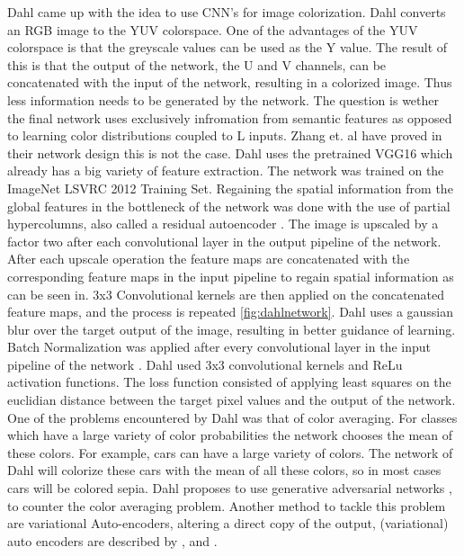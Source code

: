 Dahl \cite{Dahl} came up with the idea to use CNN's for image colorization. Dahl converts an RGB image to the YUV colorspace. One of the advantages of the YUV colorspace is that the greyscale values can be used as the Y value.
The result of this is that the output of the network, the U and V channels, can be concatenated with the input of the network, resulting in a colorized image. Thus less information needs to be generated by the network. 
The question is wether the final network uses exclusively infromation from semantic features as opposed to learning color distributions coupled to L inputs. 
Zhang et. al \cite{Zhang} have proved in their network design this is not the case. Dahl uses the pretrained VGG16 which already has a big variety of feature extraction. The network was trained on the ImageNet LSVRC 2012 Training Set. Regaining the spatial information from the global features in the bottleneck of the network was done with the use of partial hypercolumns, also called a residual autoencoder \cite{hariharan2015hypercolumns}. The image is upscaled by a factor two after each convolutional layer in the output pipeline of the network. After each upscale operation the feature maps are concatenated with the corresponding feature maps in the input pipeline to regain spatial information as can be seen in. 3x3 Convolutional kernels are then applied on the concatenated feature maps, and the process is repeated \ref{fig:dahlnetwork}. Dahl uses a gaussian blur over the target output of the image, resulting in better guidance of learning. Batch Normalization was applied after every convolutional layer in the input pipeline of the network \cite{ioffe2015batch}. Dahl used 3x3 convolutional kernels and ReLu activation functions. The loss function consisted of applying least squares on the euclidian distance between the target pixel values and the output of the network. One of the problems encountered by Dahl was that of color averaging. For classes which have a large variety of color probabilities the network chooses the mean of these colors. For example, cars can have a large variety of colors. The network of Dahl will colorize these cars with the mean of all these colors, so in most cases cars will be colored sepia. Dahl proposes to use generative adversarial networks \cite{Radford}, to counter the color averaging problem. Another method to tackle this problem are variational Auto-encoders, altering a direct copy of the output, (variational) auto encoders are described by \cite{Gregor}, \cite{Kingma} and \cite{GoodfellowBOOK}. 



